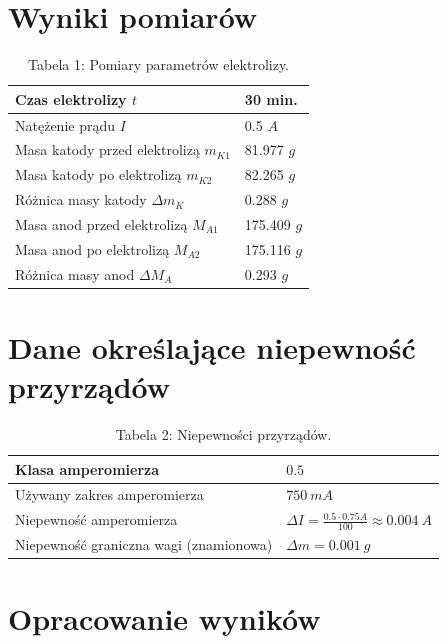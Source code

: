 \documentclass{fizykalab}
\begin{document}
{\section*{Wyniki pomiarów}
\par
\begin{table}[H]
	\centering
	\begin{tabular}{|l|l|}
		\hline
		\rule{0pt}{1em} Czas elektrolizy $t$ & 30 min. \\ \hline
		\rule{0pt}{1em} Natężenie prądu $I$ & 0.5 $A$ \\ \hline\hline
		\rule{0pt}{1em} Masa katody przed elektrolizą $m_{K1}$ & 81.977 $g$ \\ \hline
		\rule{0pt}{1em} Masa katody po elektrolizą $m_{K2}$ & 82.265 $g$ \\ \hline
		\rule{0pt}{1em} Różnica masy katody $\Delta m_K$ & 0.288 $g$ \\ \hline\hline
		\rule{0pt}{1em} Masa anod przed elektrolizą $M_{A1}$ & 175.409 $g$ \\ \hline
		\rule{0pt}{1em} Masa anod po elektrolizą $M_{A2}$ & 175.116 $g$ \\ \hline
		\rule{0pt}{1em} Różnica masy anod $\Delta M_A$ & 0.293 $g$ \\ \hline
	\end{tabular}
	\caption*{Tabela 1: Pomiary parametrów elektrolizy.}
\end{table}

\section*{Dane określające niepewność przyrządów}
\par
\begin{table}[H]
	\centering
	\begin{tabular}{|l|l|}
		\hline
		\rule{0pt}{1em} Klasa amperomierza & $0.5$ \\ \hline
		\rule{0pt}{1em} Używany zakres amperomierza & $750 \ mA$ \\ \hline
		\rule{0pt}{1em} Niepewność amperomierza & $\Delta I = \frac{0.5 \cdot 0.75 A}{100} \approx 0.004 \ A$ \\ \hline
		\rule{0pt}{1em} Niepewność graniczna wagi (znamionowa) & $ \Delta m = 0.001 \ g$ \\ \hline
	\end{tabular}
	\caption*{Tabela 2: Niepewności przyrządów.}
\end{table}

\section*{Opracowanie wyników}
}
\end{document}
